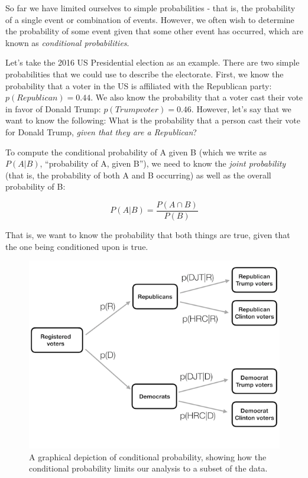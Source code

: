 \documentclass[12pt,]{book}
\theoremstyle{definition}
\theoremstyle{definition}
\theoremstyle{definition}
\theoremstyle{remark}
\begin{document}
So far we have limited ourselves to simple probabilities - that is, the probability of a single event or combination of events. However, we often wish to determine the probability of some event given that some other event has occurred, which are known as \emph{conditional probabilities}.

Let's take the 2016 US Presidential election as an example. There are two simple probabilities that we could use to describe the electorate. First, we know the probability that a voter in the US is affiliated with the Republican party: \(p(Republican) = 0.44\). We also know the probability that a voter cast their vote in favor of Donald Trump: \(p(Trump voter)=0.46\). However, let's say that we want to know the following: What is the probability that a person cast their vote for Donald Trump, \emph{given that they are a Republican}?

To compute the conditional probability of A given B (which we write as \(P(A|B)\), ``probability of A, given B''), we need to know the \emph{joint probability} (that is, the probability of both A and B occurring) as well as the overall probability of B:

\[
P(A|B) = \frac{P(A \cap B)}{P(B)}
\]

That is, we want to know the probability that both things are true, given that the one being conditioned upon is true.

\begin{figure}
\includegraphics[width=8in,height=0.5\textheight]{images/conditional_probability} \caption{A graphical depiction of conditional probability, showing how the conditional probability limits our analysis to a subset of the data.}\label{fig:conditionalProbability}
\end{figure}
\end{document}

